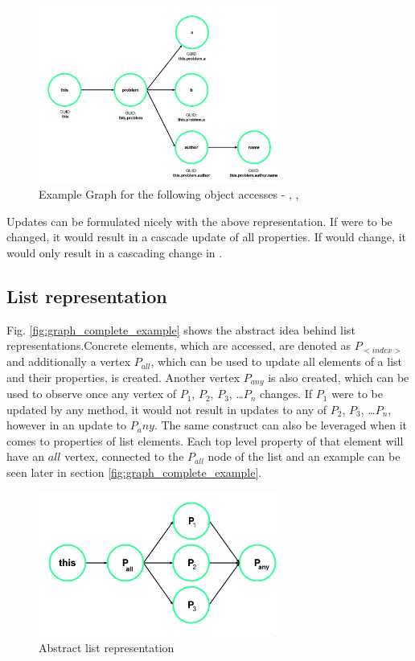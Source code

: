\begin{figure}[H]
    \centering
    \includegraphics[width=0.7\textwidth]{images/graph_object.png}
     \caption{Example Graph for the following object accesses - , ,   }
     \label{fig:graph_object}
\end{figure}

Updates can be formulated nicely with the above representation. If  were to be changed, it would result in a cascade update of all properties. If  would change, it would only result in a cascading change in . 

\subsection{List representation}
Fig. \ref{fig:graph_complete_example} shows the abstract idea behind list representations.Concrete elements, which are accessed, are denoted as $P_{<index>}$ and additionally a vertex $P_{all}$, which can be used to update all elements of a list\label{concept:why_create_list} and their properties, is created. Another vertex $P_{any}$ is also created, which can be used to observe once any vertex of $P_1$, $P_2$, $P_3$, \dots $P_n$ changes. If $P_1$ were to be updated by any method, it would not result in updates to any of $P_2$, $P_3$, \dots $P_n$, however in an update to $P_any$. The same construct can also be leveraged when it comes to properties of list elements. Each top level property of that element will have an $all$ vertex, connected to the $P_{all}$ node of the list and an example can be seen later in section \ref{fig:graph_complete_example}.  

\label{concept:list_creation}
\begin{figure}[H]
    \centering
    \includegraphics[width=0.7\textwidth]{images/graph_list_generic.png}
     \caption{Abstract list representation}
     \label{fig:graph_list_generic}
\end{figure}

